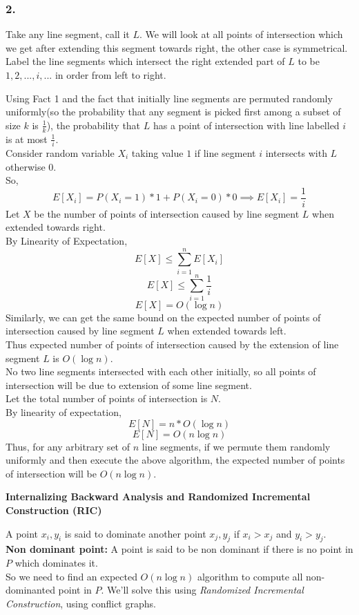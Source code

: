 \documentclass[a4paper]{article}
\begin{document}
\subsubsection*{2.}
Take any line segment, call it $L$. We will look at all points of intersection which we get after extending this segment towards right, the other case is symmetrical.\\
Label the line segments which intersect the right extended part of $L$ to be $1,2,...,i,...$ in order from left to right.\\
\begin{warn}\end{warn}
Using Fact 1 and the fact that initially line segments are permuted randomly uniformly(so the probability that any segment is picked first among a subset of size $k$ is $\frac{1}{k}$), the probability that $L$ has a point of intersection with line labelled $i$ is at most $\frac{1}{i}$.\\
Consider random variable $X_i$ taking value $1$ if line segment $i$ intersects with $L$ otherwise $0$.\\
So, $$E[X_i] = P(X_i = 1)*1 + P(X_i = 0)*0 \implies E[X_i] =  \frac{1}{i}$$
Let $X$ be the number of points of intersection caused by line segment $L$ when extended towards right.\\
By Linearity of Expectation, 
$$E[X] \leq \sum_{i=1}^n E[X_i]$$
$$E[X] \leq \sum_{i=1}^n \frac{1}{i}$$
$$E[X] = O(\log n)$$
Similarly, we can get the same bound on the expected number of points of intersection caused by line segment $L$ when extended towards left.\\
Thus expected number of points of intersection caused by the extension of line segment $L$ is $O(\log n)$.\\
No two line segments intersected with each other initially, so all points of intersection will be due to extension of some line segment.\\
Let the total number of points of intersection is $N$.\\
By linearity of expectation,
$$E[N] = n*O(\log n)$$
$$E[N] = O(n\log n)$$
Thus, for any arbitrary set of $n$ line segments, if we permute them randomly uniformly and then execute the above algorithm, the expected number of points of intersection will be $O(n \log n)$.
\pagebreak

\begin{question}[]
\textbf{Internalizing Backward Analysis and Randomized Incremental Construction (RIC)}
\end{question}
A point $x_i, y_i$ is said to dominate another point $x_j, y_j$ if $x_i > x_j$ and $y_i > y_j$. \\
\textbf{Non dominant point: } A point is said to be non dominant if there is no point in $P$ which dominates it. \\
So we need to find an expected $O(n\log n)$ algorithm to compute all non-dominanted point in $P$. We'll solve this using \textit{Randomized Incremental Construction}, using conflict graphs. \\ \\
\end{document}
